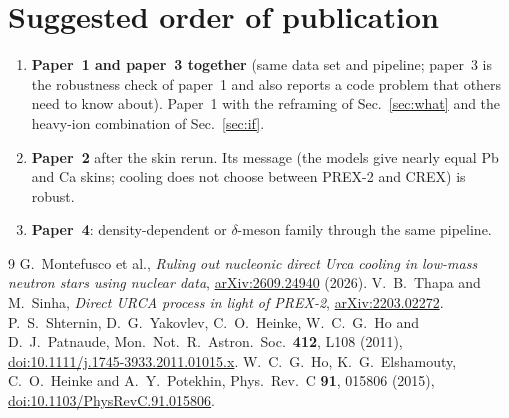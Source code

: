 \documentclass[11pt,a4paper]{article}
\newcommand{\doi}[1]{\href{https://doi.org/#1}{doi:#1}}
\newcommand{\arxiv}[1]{\href{https://arxiv.org/abs/#1}{arXiv:#1}}
\begin{document}
\section{Suggested order of publication}
\begin{enumerate}[leftmargin=*]
\item \textbf{Paper~1 and paper~3 together} (same data set and pipeline; paper~3 is the robustness check of paper~1 and also reports a code problem that others need to know about). Paper~1 with the reframing of Sec.~\ref{sec:what} and the heavy-ion combination of Sec.~\ref{sec:if}.
\item \textbf{Paper~2} after the skin rerun. Its message (the models give nearly equal Pb and Ca skins; cooling does not choose between PREX-2 and CREX) is robust.
\item \textbf{Paper~4}: density-dependent or $\delta$-meson family through the same pipeline.
\end{enumerate}

\begin{thebibliography}{9}
\small
{} G.~Montefusco et al., \emph{Ruling out nucleonic direct Urca cooling in low-mass neutron stars using nuclear data}, \arxiv{2609.24940} (2026).
 V.~B.~Thapa and M.~Sinha, \emph{Direct URCA process in light of PREX-2}, \arxiv{2203.02272}.
 P.~S.~Shternin, D.~G.~Yakovlev, C.~O.~Heinke, W.~C.~G.~Ho and D.~J.~Patnaude, Mon.\ Not.\ R.\ Astron.\ Soc.\ \textbf{412}, L108 (2011), \doi{10.1111/j.1745-3933.2011.01015.x}.
 W.~C.~G.~Ho, K.~G.~Elshamouty, C.~O.~Heinke and A.~Y.~Potekhin, Phys.\ Rev.\ C \textbf{91}, 015806 (2015), \doi{10.1103/PhysRevC.91.015806}.
\end{thebibliography}
\end{document}
